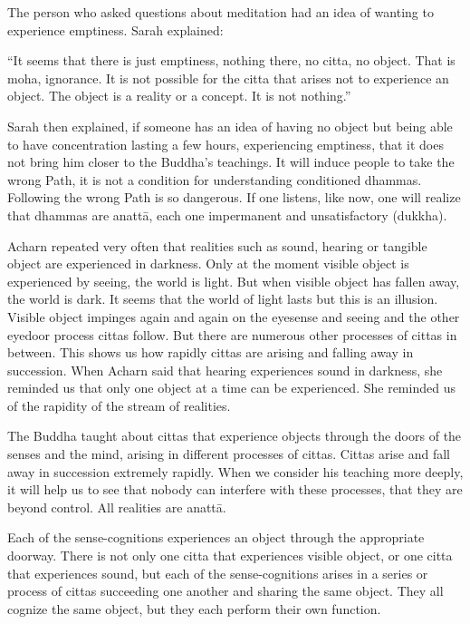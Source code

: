 The person who asked questions about meditation had an idea of wanting to experience emptiness. Sarah explained: 

``It seems that there is just emptiness, nothing there, no citta, no object. That is 
moha, ignorance. It is not possible for the citta that arises not to experience an 
object. The object is a reality or a concept. It is not nothing.'' 

Sarah then explained, if someone has an idea of having no object but being able 
to have concentration lasting a few hours, experiencing emptiness, that it does 
not bring him closer to the Buddha's teachings. It will induce people to take the 
wrong Path, it is not a condition for understanding conditioned dhammas. Following the wrong Path is so dangerous. If one listens, like now, one will realize 
that dhammas are anattā, each one impermanent and unsatisfactory (dukkha). 

Acharn repeated very often that realities such as sound, hearing or tangible object are experienced in darkness. Only at the moment visible object is experienced by seeing, the world is light. But when visible object has fallen away, the 
world is dark. It seems that the world of light lasts but this is an illusion. Visible 
object impinges again and again on the eyesense and seeing and the other eyedoor process cittas follow. But there are numerous other processes of cittas in 
between. This shows us how rapidly cittas are arising and falling away in succession. When Acharn said that hearing experiences sound in darkness, she reminded us that only one object at a time can be experienced. She reminded us of 
the rapidity of the stream of realities. 

The Buddha taught about cittas that experience objects through the doors of the 
senses and the mind, arising in different processes of cittas. Cittas arise and fall 
away in succession extremely rapidly. When we consider his teaching more 
deeply, it will help us to see that nobody can interfere with these processes, that 
they are beyond control. All realities are anattā. 

Each of the sense-cognitions experiences an object through the appropriate 
doorway. There is not only one citta that experiences visible object, or one citta 
that experiences sound, but each of the sense-cognitions arises in a series or 
process of cittas succeeding one another and sharing the same object. They all 
cognize the same object, but they each perform their own function. 

